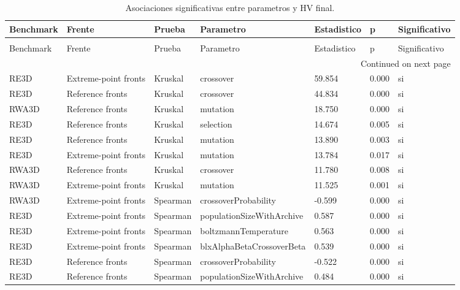 \documentclass[11pt,a4paper]{article}
\begin{document}
{\scriptsize
\setlength{\LTpre}{0pt}
\setlength{\LTpost}{0pt}
\begin{longtable}{lllllll}
\caption{Asociaciones significativas entre parametros y HV final.} \label{tab:parameter_association} \\
\toprule
Benchmark & Frente & Prueba & Parametro & Estadistico & p & Significativo \\
\midrule
\endfirsthead
\caption[]{Asociaciones significativas entre parametros y HV final.} \\
\toprule
Benchmark & Frente & Prueba & Parametro & Estadistico & p & Significativo \\
\midrule
\endhead
\midrule
\multicolumn{7}{r}{Continued on next page} \\
\midrule
\endfoot
\bottomrule
\endlastfoot
RE3D & Extreme-point fronts & Kruskal & crossover & 59.854 & 0.000 & si \\
RE3D & Reference fronts & Kruskal & crossover & 44.834 & 0.000 & si \\
RWA3D & Reference fronts & Kruskal & mutation & 18.750 & 0.000 & si \\
RE3D & Reference fronts & Kruskal & selection & 14.674 & 0.005 & si \\
RE3D & Reference fronts & Kruskal & mutation & 13.890 & 0.003 & si \\
RE3D & Extreme-point fronts & Kruskal & mutation & 13.784 & 0.017 & si \\
RWA3D & Reference fronts & Kruskal & crossover & 11.780 & 0.008 & si \\
RWA3D & Extreme-point fronts & Kruskal & mutation & 11.525 & 0.001 & si \\
RWA3D & Extreme-point fronts & Spearman & crossoverProbability & -0.599 & 0.000 & si \\
RE3D & Extreme-point fronts & Spearman & populationSizeWithArchive & 0.587 & 0.000 & si \\
RE3D & Extreme-point fronts & Spearman & boltzmannTemperature & 0.563 & 0.000 & si \\
RE3D & Extreme-point fronts & Spearman & blxAlphaBetaCrossoverBeta & 0.539 & 0.000 & si \\
RE3D & Reference fronts & Spearman & crossoverProbability & -0.522 & 0.000 & si \\
RE3D & Reference fronts & Spearman & populationSizeWithArchive & 0.484 & 0.000 & si \\
\end{longtable}

}
\end{document}
